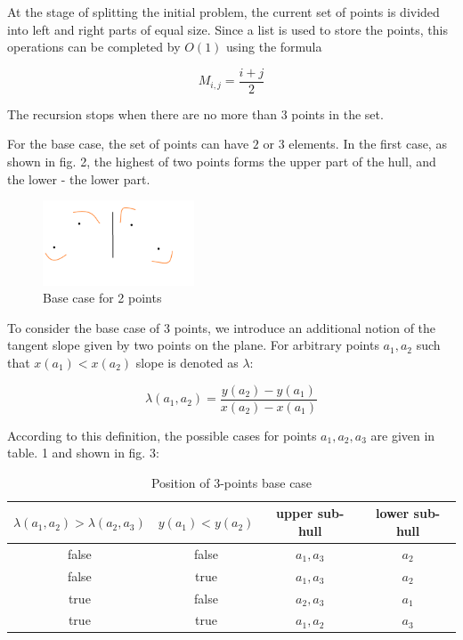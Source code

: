 \documentclass[conference]{IEEEtran}
\theoremstyle{plane}
\begin{document}
At the stage of splitting the initial problem, the current set of points is divided into left and right parts of equal size. Since a list is used to store the points, this operations can be completed by $O(1)$ using the formula

\begin{equation}
M_{i,j}=\frac{i+j}{2}
\end{equation}

The recursion stops when there are no more than $3$ points in the set.

For the base case, the set of points can have $2$ or $3$ elements. In the first case, as shown in fig. 2, the highest of two points forms the upper part of the hull, and the lower - the lower part.

\begin{figure}[htbp]
	\centerline{\includegraphics[width=0.4\textwidth, height=0.2\textheight]{base_case_2}}
	\caption{Base case for 2 points}
	\label{base_case_2}
\end{figure}

To consider the base case of $3$ points, we introduce an additional notion of the tangent slope given by two points on the plane. For arbitrary points $a_1, a_2$ such that $x(a_1)<x(a_2)$ slope is denoted as $\lambda$:

\begin{equation}
\lambda(a_1, a_2)=\frac{y(a_2)-y(a_1)}{x(a_2)-x(a_1)}
\end{equation}

According to this definition, the possible cases for points $a_1,a_2,a_3$ are given in table. 1 and shown in fig. 3:

\begin{table}[htbp]
	\caption{Position of 3-points base case}
	\begin{center}
		\begin{tabular}{|c|c|c|c|}
			\hline
			\textbf{$\lambda(a_1, a_2) > \lambda(a_2, a_3)$} & \textbf{$y(a_1) < y(a_2)$} & upper sub-hull & lower sub-hull \\
			\hline
			false & false & $a_1, a_3$ & $a_2$ \\
			\hline
			false & true & $a_1, a_3$ & $a_2$ \\
			\hline
			true & false & $a_2, a_3$ & $a_1$ \\
			\hline
			true & true & $a_1, a_2$ & $a_3$ \\
			\hline
		\end{tabular} 
	\end{center}
\end{table} 
\end{document}
